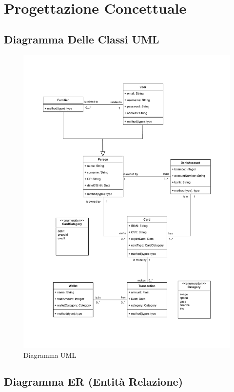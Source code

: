 \chapter{Progettazione Concettuale}

\section{Diagramma Delle Classi UML}

\begin{figure}[ht!]
    \centering
    \includegraphics[scale=0.55]{pdfs/UMLdiagram.drawio.pdf}
    \caption{Diagramma UML}\label{UML}
\end{figure}

\section{Diagramma ER (Entità Relazione)}

